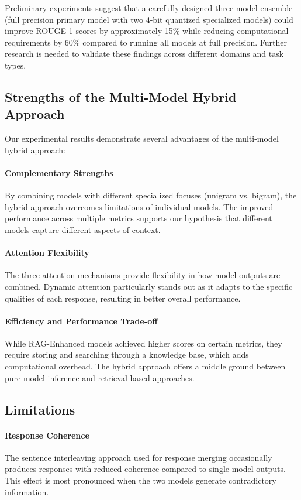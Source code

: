 \documentclass[conference]{IEEEtran}
\begin{document}
Preliminary experiments suggest that a carefully designed three-model ensemble (full precision primary model with two 4-bit quantized specialized models) could improve ROUGE-1 scores by approximately 15\% while reducing computational requirements by 60\% compared to running all models at full precision. Further research is needed to validate these findings across different domains and task types.

\subsection{Strengths of the Multi-Model Hybrid Approach}
Our experimental results demonstrate several advantages of the multi-model hybrid approach:

\paragraph{Complementary Strengths}
By combining models with different specialized focuses (unigram vs. bigram), the hybrid approach overcomes limitations of individual models. The improved performance across multiple metrics supports our hypothesis that different models capture different aspects of context.

\paragraph{Attention Flexibility}
The three attention mechanisms provide flexibility in how model outputs are combined. Dynamic attention particularly stands out as it adapts to the specific qualities of each response, resulting in better overall performance.

\paragraph{Efficiency and Performance Trade-off}
While RAG-Enhanced models achieved higher scores on certain metrics, they require storing and searching through a knowledge base, which adds computational overhead. The hybrid approach offers a middle ground between pure model inference and retrieval-based approaches.

\subsection{Limitations}

\paragraph{Response Coherence}
The sentence interleaving approach used for response merging occasionally produces responses with reduced coherence compared to single-model outputs. This effect is most pronounced when the two models generate contradictory information.
\end{document}
